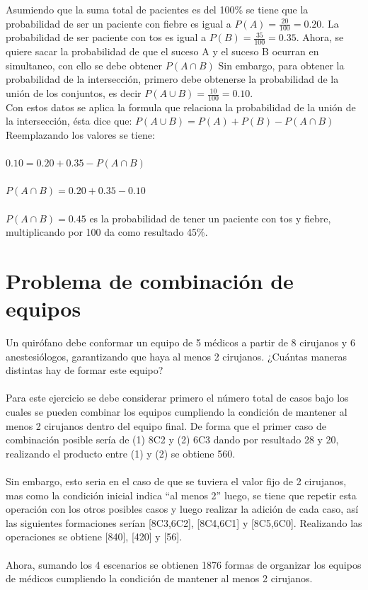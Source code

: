 \documentclass[12pt]{article}
\begin{document}
Asumiendo que la suma total de pacientes es del 100\% se tiene que la probabilidad de ser un paciente con fiebre es igual a $P(A)=\frac{20}{100}=0.20.$ La probabilidad de ser paciente con tos es igual a $P(B)=\frac{35}{100}=0.35$. Ahora, se quiere sacar la probabilidad de que el suceso A y el suceso B ocurran en simultaneo, con ello se debe obtener $P(A\cap B)$ Sin embargo, para obtener la probabilidad de la intersección, primero debe obtenerse la probabilidad de la unión de los conjuntos, es decir $P(A\cup B)=\frac{10}{100}=0.10$.\\

Con estos datos se aplica la formula que relaciona la probabilidad de la unión de la intersección, ésta dice que: $P(A\cup  B) = P(A) + P(B) - P(A\cap  B)$ Reemplazando los valores se tiene:
        \\\\$0.10 = 0.20 + 0.35 - P(A\cap  B)$ 
\\\\$P(A\cap  B)=0.20 + 0.35 - 0.10$ 
\\\\$P(A\cap  B)= 0.45$ es la probabilidad de tener un paciente con tos y fiebre, multiplicando por 100 da como resultado 45\%.

\section{Problema de combinación de equipos}


Un quirófano debe conformar un equipo de 5 médicos a partir de 8 cirujanos y 6 anestesiólogos, garantizando que haya al menos 2 cirujanos. ¿Cuántas maneras distintas hay de formar este equipo?
\\\\Para este ejercicio se debe considerar primero el número total de casos bajo los cuales se pueden combinar los equipos cumpliendo la condición de mantener al menos 2 cirujanos dentro del equipo final. De forma que el primer caso de combinación posible sería de (1) 8C2 y (2) 6C3 dando por resultado 28 y 20, realizando el producto entre (1) y (2) se obtiene 560.
\\\\Sin embargo, esto seria en el caso de que se tuviera el valor fijo de 2 cirujanos, mas como la condición inicial indica “al menos 2” luego, se tiene que repetir esta operación con los otros posibles casos y luego realizar la adición de cada caso, así las siguientes formaciones serían [8C3,6C2], [8C4,6C1] y [8C5,6C0]. Realizando las operaciones se obtiene [840], [420] y [56].
\\\\Ahora, sumando los 4 escenarios se obtienen 1876 formas de organizar los equipos de médicos cumpliendo la condición de mantener al menos 2 cirujanos.
\end{document}
